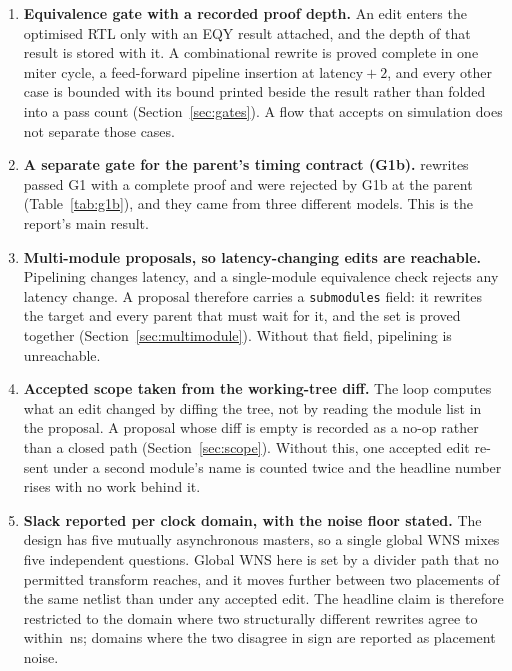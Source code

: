 \documentclass[11pt,a4paper]{article}
\begin{document}
\begin{enumerate}[leftmargin=1.4em]
  \item \textbf{Equivalence gate with a recorded proof depth.} An edit enters
        the optimised RTL only with an EQY result attached, and the depth of
        that result is stored with it. A combinational rewrite is proved
        complete in one miter cycle, a feed-forward pipeline insertion at
        latency${}+2$, and every other case is bounded with its bound printed
        beside the result rather than folded into a pass count
        (Section~\ref{sec:gates}). A flow that accepts on simulation does not
        separate those cases.

  \item \textbf{A separate gate for the parent's timing contract (G1b).}
        \numcontractkills{} rewrites passed G1 with a complete proof and were
        rejected by G1b at the parent (Table~\ref{tab:g1b}), and they came from
        three different models. This is the report's main result.

  \item \textbf{Multi-module proposals, so latency-changing edits are
        reachable.} Pipelining changes latency, and a single-module
        equivalence check rejects any latency change. A proposal therefore
        carries a \texttt{submodules} field: it rewrites the target and every
        parent that must wait for it, and the set is proved together
        (Section~\ref{sec:multimodule}). Without that field, pipelining is
        unreachable.

  \item \textbf{Accepted scope taken from the working-tree diff.} The loop
        computes what an edit changed by diffing the tree, not by reading the
        module list in the proposal. A proposal whose diff is empty is
        recorded as a no-op rather than a closed path
        (Section~\ref{sec:scope}). Without this, one accepted edit re-sent
        under a second module's name is counted twice and the headline number
        rises with no work behind it.

  \item \textbf{Slack reported per clock domain, with the noise floor
        stated.} The design has five mutually asynchronous masters, so a
        single global WNS mixes five independent questions. Global WNS here is
        set by a divider path that no permitted transform reaches, and it
        moves further between two placements of the same netlist than under
        any accepted edit. The headline claim is therefore restricted to the
        domain where two structurally different rewrites agree to within
        \bestagreement\,ns; domains where the two disagree in sign are
        reported as placement noise.
\end{enumerate}
\end{document}
